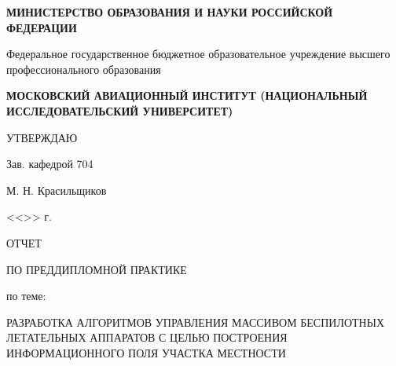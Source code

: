 \begin{titlepage}
\newpage

\def\tlb{\tabularnewline}

\begin{center}

    \textbf{МИНИСТЕРСТВО ОБРАЗОВАНИЯ И НАУКИ\lb
    РОССИЙСКОЙ ФЕДЕРАЦИИ}

    \vspace{0.5em}
    Федеральное государственное бюджетное образовательное учреждение\lb
    высшего профессионального образования
    \vspace{0.5em}

    \textbf{МОСКОВСКИЙ АВИАЦИОННЫЙ ИНСТИТУТ\lb
    (НАЦИОНАЛЬНЫЙ ИССЛЕДОВАТЕЛЬСКИЙ УНИВЕРСИТЕТ)}

\end{center}

\vspace{1.5em}

\begin{flushright}
    \begin{center}
        \hspace{10cm}
        УТВЕРЖДАЮ
    \end{center}

    \begin{flushleft}
        \hspace{10.5cm}
        Зав. кафедрой 704
    \end{flushleft}

    \underline{\hspace{3cm}} М. Н. Красильщиков

    <<\underline{\hspace{0.7cm}}>> \underline{\hspace{3.5cm}} \underline{\hspace{1.5cm}}г.

\end{flushright}

\begin{center}
    ОТЧЕТ

    ПО ПРЕДДИПЛОМНОЙ ПРАКТИКЕ

    \vspace{0.5em}

    по теме:

    \vspace{0.5em}

    РАЗРАБОТКА АЛГОРИТМОВ УПРАВЛЕНИЯ МАССИВОМ БЕСПИЛОТНЫХ
    ЛЕТАТЕЛЬНЫХ АППАРАТОВ С ЦЕЛЬЮ ПОСТРОЕНИЯ ИНФОРМАЦИОННОГО
    ПОЛЯ УЧАСТКА МЕСТНОСТИ
\end{center}


\end{titlepage}
